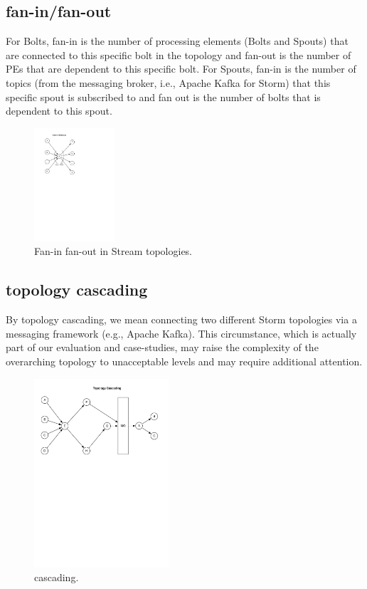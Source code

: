 \subsection{fan-in/fan-out}

For Bolts, fan-in is the number of processing elements (Bolts and Spouts) that are connected to this specific bolt in the topology and fan-out is the number of PEs that are dependent to this specific bolt. For Spouts, fan-in is the number of topics (from the messaging broker, i.e., Apache Kafka for Storm) that this specific spout is subscribed to and fan out is the number of bolts that is dependent to this spout.

\begin{figure}[H]
	\begin{center}
		\includegraphics[width=3cm]{images/fan-in-out}
		\caption{Fan-in fan-out in Stream topologies.}
		\label{fig:fan}
	\end{center}
\end{figure}

\subsection{topology cascading}

By topology cascading, we mean connecting two different Storm topologies via a messaging framework (e.g., Apache Kafka). This circumstance, which is actually part of our evaluation and case-studies, may raise the complexity of the overarching topology to unacceptable levels and may require additional attention.

\begin{figure}[H]
	\begin{center}
		\includegraphics[width=5cm]{images/cascading}
		\caption{cascading.}
		\label{fig:cascading}
	\end{center}
\end{figure}

